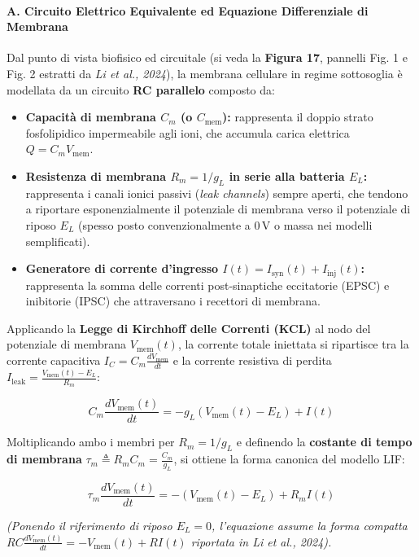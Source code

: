 \documentclass[11pt,a4paper]{article}
\begin{document}
\paragraph{A. Circuito Elettrico Equivalente ed Equazione Differenziale di Membrana}
Dal punto di vista biofisico ed circuitale (si veda la \textbf{Figura 17}, pannelli Fig. 1 e Fig. 2 estratti da \textit{Li et al., 2024}), la membrana cellulare in regime sottosoglia è modellata da un circuito \textbf{RC parallelo} composto da:
\begin{itemize}
  \item \textbf{Capacità di membrana $C_m$ (o $C_{\text{mem}}$):} rappresenta il doppio strato fosfolipidico impermeabile agli ioni, che accumula carica elettrica $Q = C_m V_{\text{mem}}$.
  \item \textbf{Resistenza di membrana $R_m = 1/g_L$ in serie alla batteria $E_L$:} rappresenta i canali ionici passivi (\textit{leak channels}) sempre aperti, che tendono a riportare esponenzialmente il potenziale di membrana verso il potenziale di riposo $E_L$ (spesso posto convenzionalmente a $0\,\text{V}$ o massa nei modelli semplificati).
  \item \textbf{Generatore di corrente d'ingresso $I(t) = I_{\text{syn}}(t) + I_{\text{inj}}(t)$:} rappresenta la somma delle correnti post-sinaptiche eccitatorie (EPSC) e inibitorie (IPSC) che attraversano i recettori di membrana.
\end{itemize}

Applicando la \textbf{Legge di Kirchhoff delle Correnti (KCL)} al nodo del potenziale di membrana $V_{\text{mem}}(t)$, la corrente totale iniettata si ripartisce tra la corrente capacitiva $I_C = C_m \frac{dV_{\text{mem}}}{dt}$ e la corrente resistiva di perdita $I_{\text{leak}} = \frac{V_{\text{mem}}(t) - E_L}{R_m}$:

\[
C_m \frac{dV_{\text{mem}}(t)}{dt} = -g_L \left(V_{\text{mem}}(t) - E_L\right) + I(t)
\]

Moltiplicando ambo i membri per $R_m = 1/g_L$ e definendo la \textbf{costante di tempo di membrana} $\tau_m \triangleq R_m C_m = \frac{C_m}{g_L}$, si ottiene la forma canonica del modello LIF:

\[
\tau_m \frac{dV_{\text{mem}}(t)}{dt} = -\left(V_{\text{mem}}(t) - E_L\right) + R_m I(t)
\]

\textit{(Ponendo il riferimento di riposo $E_L = 0$, l'equazione assume la forma compatta $R C \frac{dV_{\text{mem}}(t)}{dt} = -V_{\text{mem}}(t) + R I(t)$ riportata in Li et al., 2024).}
\end{document}
